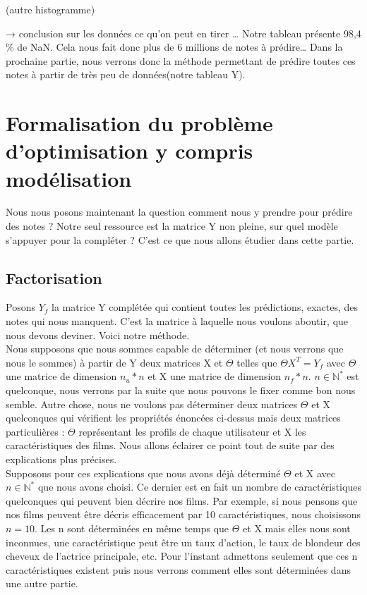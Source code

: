 \documentclass[a4paper,10pt]{article}
\begin{document}
(autre histogramme)

→ conclusion sur les données ce qu’on peut en tirer …
Notre tableau présente 98,4 \% de NaN. Cela nous fait donc plus de 6 millions de notes à prédire… Dans la prochaine partie,
nous verrons donc la méthode permettant de prédire toutes ces notes à partir de très peu de données(notre tableau Y).


\section{Formalisation du problème d'optimisation y compris modélisation}

Nous nous posons maintenant la question comment nous y prendre pour prédire des notes ?
Notre seul ressource est la matrice Y non pleine, sur quel modèle s'appuyer pour la compléter ?
C'est ce que nous allons étudier dans cette partie.

\subsection{Factorisation}

Posons $Y_f$ la matrice Y complétée qui contient toutes les prédictions, exactes, des notes qui nous manquent. C'est la matrice à laquelle nous voulons aboutir, que nous devons deviner. Voici notre méthode.\\ 
 
Nous supposons que nous sommes capable de déterminer (et nous verrons que nous le sommes) à partir de Y deux matrices X et $\Theta$ telles que $\Theta X^T = Y_f$ avec $\Theta$ une matrice de dimension $n_u * n$ et X une matrice de dimension $n_f * n$. $n \in \mathbb{N}^*$ est quelconque, nous verrons par la suite que nous pouvons le fixer comme bon nous semble. 
Autre chose, nous ne voulons pas déterminer deux matrices $\Theta$ et X quelconques qui vérifient les propriétés énoncées ci-dessus mais deux matrices particulières : $\Theta$ représentant les profils de chaque utilisateur et X les caractéristiques des films. Nous allons éclairer ce point tout de suite par des explications plus précises.\\ 
 
Supposons pour ces explications que nous avons déjà déterminé $\Theta$ et X avec $n \in \mathbb{N}^*$ que nous avons choisi. Ce dernier est en fait un nombre de caractéristiques quelconques qui peuvent bien décrire nos films. Par exemple, si nous pensons que nos films peuvent être décris efficacement par 10 caractéristiques, nous choisissons $n = 10$. 
Les n sont déterminées en même temps que $\Theta$ et X mais elles nous sont inconnues, une caractéristique peut être un taux d'action, le taux de blondeur des cheveux de l'actrice principale, etc. Pour l'instant admettons seulement que ces n caractéristiques existent puis nous verrons comment elles sont déterminées dans une autre partie. 
\end{document}
